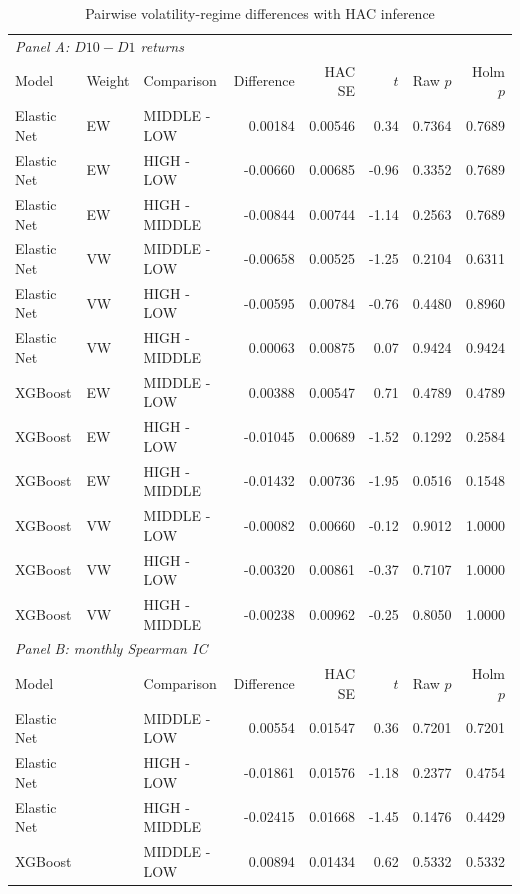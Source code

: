 \begin{table}[htbp]
\centering
\caption{Pairwise volatility-regime differences with HAC inference}
\label{tab:regime-difference-inference}
\small
\begin{tabular}{lllrrrrr}
\hline
\multicolumn{8}{l}{\textit{Panel A: $D10-D1$ returns}} \\
Model & Weight & Comparison & Difference & HAC SE & $t$ & Raw $p$ & Holm $p$ \\
\hline
Elastic Net & EW & MIDDLE - LOW & 0.00184 & 0.00546 & 0.34 & 0.7364 & 0.7689 \\
Elastic Net & EW & HIGH - LOW & -0.00660 & 0.00685 & -0.96 & 0.3352 & 0.7689 \\
Elastic Net & EW & HIGH - MIDDLE & -0.00844 & 0.00744 & -1.14 & 0.2563 & 0.7689 \\
Elastic Net & VW & MIDDLE - LOW & -0.00658 & 0.00525 & -1.25 & 0.2104 & 0.6311 \\
Elastic Net & VW & HIGH - LOW & -0.00595 & 0.00784 & -0.76 & 0.4480 & 0.8960 \\
Elastic Net & VW & HIGH - MIDDLE & 0.00063 & 0.00875 & 0.07 & 0.9424 & 0.9424 \\
XGBoost & EW & MIDDLE - LOW & 0.00388 & 0.00547 & 0.71 & 0.4789 & 0.4789 \\
XGBoost & EW & HIGH - LOW & -0.01045 & 0.00689 & -1.52 & 0.1292 & 0.2584 \\
XGBoost & EW & HIGH - MIDDLE & -0.01432 & 0.00736 & -1.95 & 0.0516 & 0.1548 \\
XGBoost & VW & MIDDLE - LOW & -0.00082 & 0.00660 & -0.12 & 0.9012 & 1.0000 \\
XGBoost & VW & HIGH - LOW & -0.00320 & 0.00861 & -0.37 & 0.7107 & 1.0000 \\
XGBoost & VW & HIGH - MIDDLE & -0.00238 & 0.00962 & -0.25 & 0.8050 & 1.0000 \\
\hline
\multicolumn{8}{l}{\textit{Panel B: monthly Spearman IC}} \\
Model &  & Comparison & Difference & HAC SE & $t$ & Raw $p$ & Holm $p$ \\
\hline
Elastic Net &  & MIDDLE - LOW & 0.00554 & 0.01547 & 0.36 & 0.7201 & 0.7201 \\
Elastic Net &  & HIGH - LOW & -0.01861 & 0.01576 & -1.18 & 0.2377 & 0.4754 \\
Elastic Net &  & HIGH - MIDDLE & -0.02415 & 0.01668 & -1.45 & 0.1476 & 0.4429 \\
XGBoost &  & MIDDLE - LOW & 0.00894 & 0.01434 & 0.62 & 0.5332 & 0.5332 \\

\end{tabular}
\end{table}
